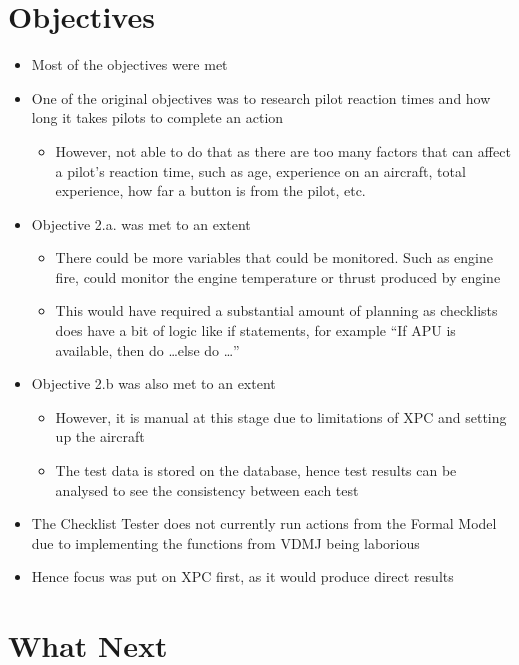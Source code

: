 \documentclass[../dissertation.tex]{subfiles}
\begin{document}
\section{Objectives}
\begin{itemize}
  \item Most of the objectives were met
  \item One of the original objectives was to research pilot
    reaction times and how long it takes pilots to complete an action
  \begin{itemize}
    \item However, not able to do that as there are too many factors
      that can affect a pilot's reaction time, such as age,
      experience on an aircraft, total experience, how far a button is
      from the pilot, etc.
  \end{itemize}
  \item Objective 2.a. was met to an extent
  \begin{itemize}
    \item There could be more variables that could be monitored. Such
      as engine fire, could monitor the engine temperature or thrust
      produced by engine
    \item This would have required a substantial amount of planning
      as checklists does have a bit of logic like if statements,
      for example \enquote{If APU is available, then do \ldots else do \ldots}
  \end{itemize}
  \item Objective 2.b was also met to an extent
  \begin{itemize}
    \item However, it is manual at this stage due to limitations of XPC
      and setting up the aircraft
    \item The test data is stored on the database, hence test results
      can be analysed to see the consistency between each test
  \end{itemize}
  \item The Checklist Tester does not currently run actions from the
    Formal Model due to implementing the functions from VDMJ being
    laborious
  \item Hence focus was put on XPC first, as it would produce direct results
\end{itemize}


\section{What Next}
\end{document}
